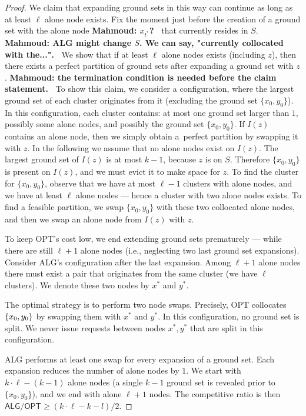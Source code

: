 \documentclass[manuscript,screen=true, review, anonymous]{acmart}
\newcommand{\OPT}{\textsf{OPT}\xspace}
\newcommand{\ALG}{\textsf{ALG}\xspace}
\DeclarePairedDelimiter\set{\{}{\}}
\newcommand\mahmoud[1]{\color{orange}\textbf{Mahmoud: #1~}\color{black}}
\begin{document}
\begin{proof}
	We claim that expanding ground sets in this way can continue as long as at least $\ell$ alone node exists.
	Fix the moment just before the creation of a ground set with the alone node \mahmoud{$x_{t^*}$?} that currently resides in $S$.
	\mahmoud{ALG might change $S$. We can say, "currently collocated with the...".}
	We show that if at least $\ell$ alone nodes exists (including $z$), then there exists a perfect partition of ground sets after expanding a ground set with $z$.
	\mahmoud{the termination condition is needed before the claim statement.}
	To show this claim, we consider a configuration, where the largest ground set of each cluster originates from it (excluding the ground set $\{x_0, y_0\}$).
	In this configuration, each cluster contains:  at most one ground set larger than $1$, possibly some alone nodes, and possibly the ground set $\{x_0, y_0\}$.
	If $I(z)$ contains an alone node, then we simply obtain a~perfect partition by swapping it with $z$.
	In the following we assume that no alone nodes exist on $I(z)$.
	The largest ground set of $I(z)$ is at most $k-1$, because $z$ is on $S$.
	Therefore $\{x_0, y_0\}$ is present on $I(z)$, and we must evict it to make space for $z$.
	To find the cluster for $\{x_0, y_0\}$, observe that we have at most $\ell-1$ clusters with alone nodes, and we have at least $\ell$ alone nodes --- hence a cluster with two alone nodes exists.
	To find a feasible partition, we swap $\{x_0, y_0\}$ with these two collocated alone nodes, and then we swap an alone node from $I(z)$ with $z$.
	

	To keep \OPT's cost low, we end extending ground sets prematurely --- while there are still $\ell+1$ alone nodes (i.e., neglecting two last ground set expansions).
	Consider \ALG's configuration after the last expansion.
	Among $\ell+1$ alone nodes there must exist a pair that originates from the same cluster (we have $\ell$ clusters). 
	We denote these two nodes by $x^*$ and $y^*$.

	The optimal strategy is to perform two node swaps.
	Precisely, \OPT collocates $\set{x_0,y_0}$ by swapping them with $x^*$ and $y^*$.
	In this configuration, no ground set is split.
	We never issue requests between nodes $x^*, y^*$ that are split in this configuration.


	\ALG performs at least one swap for every expansion of a ground set.
	Each expansion reduces the number of alone nodes by $1$.
	We start with $k \cdot \ell - (k-1)$ alone nodes (a single $k-1$ ground set is revealed prior to $\{x_0, y_0\}$), and we end with alone $\ell+1$ nodes.
	The competitive ratio is then $\ALG / \OPT \geq (k\cdot \ell - k - l) / 2$.
\end{proof}
\end{document}
